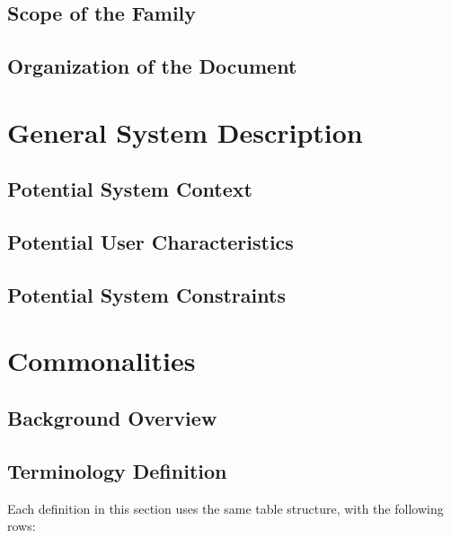 \documentclass{article}
\begin{document}
\subsection{Scope of the Family} \label{Sec_Scope}

 
\subsection{Organization of the Document}


\section{General System Description} \label{Sec_GenSystDescript}


\subsection{Potential System Context}


\subsection{Potential User Characteristics}

\subsection{Potential System Constraints}

\section{Commonalities} \label{Sec_Commonalities}

\subsection{Background Overview}

\subsection{Terminology Definition} \label{Sec_TerminologyDef}

Each definition in this section uses the same table structure, with the following rows:
\end{document}

